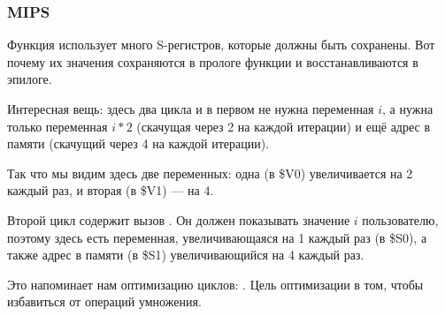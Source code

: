 ﻿\subsubsection{MIPS}
Функция использует много S-регистров, которые должны быть сохранены. Вот почему их значения сохраняются
в прологе функции и восстанавливаются в эпилоге.



Интересная вещь: здесь два цикла и в первом не нужна переменная $i$, а нужна только переменная
$i*2$ (скачущая через 2 на каждой итерации) и ещё адрес в памяти (скачущий через 4 на каждой итерации).

Так что мы видим здесь две переменных: одна (в \$V0) увеличивается на 2 каждый раз, и вторая (в \$V1) --- на 4.

Второй цикл содержит вызов \printf. Он должен показывать значение $i$ пользователю,
поэтому здесь есть переменная, увеличивающаяся на 1 каждый раз (в \$S0), а также адрес в памяти (в \$S1) 
увеличивающийся на 4 каждый раз.

Это напоминает нам оптимизацию циклов: .
Цель оптимизации в том, чтобы избавиться от операций умножения.

